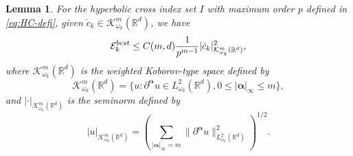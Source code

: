 \documentclass[10pt,a4paper]{amsart}
\numberwithin{equation}{section}
\numberwithin{algorithm}{section}
\theoremstyle{plain}
\newtheorem{lemma}[lemma]{Lemma}
\theoremstyle{remark}
\newcommand{\R}{\mathbb{R}}
\begin{document}
\begin{lemma} \label{lem:best-error-HC}
    For the hyperbolic cross index set $I$ with maximum order $p$ defined in \cref{eq:HC-defi}, given $\check{c}_k \in \mathcal{K}^m_{\omega_k}(\R^d)$, we have
    \begin{equation*}
        \mathcal{E}_k^{\rm best} \le C(m, d)\frac{1}{p^{m-1}} |\check{c}_k|_{\mathcal{K}^m_{\omega_k}(\R^d)}^2,
    \end{equation*}
    where $\mathcal{K}^m_{\omega_k}(\R^d)$ is the weighted Koborov-type space defined by
    \begin{equation*}
        \mathcal{K}^m_{\omega_k}(\R^d) = \{u: \partial^{\bm{\alpha}} u \in {L}^2_{\omega_k}(\R^d), 0\le |\bm{\alpha}|_\infty \le m\},
    \end{equation*}
    and $|\cdot|_{\mathcal{K}^m_{\omega_k}(\R^d)}$ is the seminorm defined by
    \begin{equation*}
        |u|_{\mathcal{K}^m_{\omega_k}(\R^d)} = \left( \sum_{|\bm{\alpha}|_\infty = m} \|\partial^{\bm{\alpha}} u\|_{{L}^2_{\omega_k}(\R^d)}^2 \right)^{1/2}.
    \end{equation*}
\end{lemma}
\end{document}
